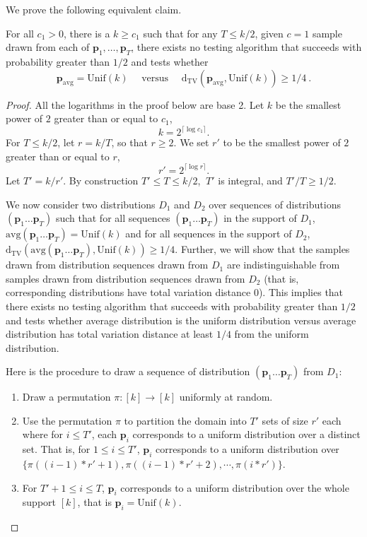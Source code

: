 \documentclass[10pt]{article} %
\theoremstyle{plain}
\newcommand{\bp}{\textbf{p}}
\newcommand{\unik}{\mathrm{Unif}(k)}%
\newcommand{\dtv}{\mathrm{d_{TV}}}
\newcommand{\avg}{\mathrm{avg}}
\begin{document}
We prove the following equivalent claim.
\begin{claim}
	For all $c_1 > 0$, there is a $k \geq c_1$ such that for any $T \leq k/2$, given $c=1$ sample drawn from each of $\bp_1,\dots,\bp_T$, there exists no testing algorithm that succeeds with probability greater than $1/2$ and tests whether 
	$$\bp_{\avg} =\unik \quad \text{ versus } \quad \dtv(\bp_{\avg},\unik) \geq 1/4~.$$
\end{claim}
\begin{proof}
	All the logarithms in the proof below are base 2.
	Let $k$ be the smallest power of $2$ greater than or equal to $c_1$,
	\[
	k = 2^{\lceil \log c_1 \rceil}.
	\]
	For $T \le k/2$, let $r = k/T$, so that $r \geq 2$. We set $r'$ to be the smallest power of $2$ greater than or equal to $r$,
	\[
	r' = 2^{\lceil \log r \rceil}.
	\]
	Let $T' = k/r'$. By construction $T' \leq T \leq k/2$, $\ T'$ is integral, and $T'/T \geq 1/2$.
	
	We now consider two distributions $D_1$ and $D_2$ over sequences of distributions $(\bp_1\dots \bp_T)$ such that for all sequences $(\bp_1\dots \bp_T)$ in the support of $D_1$, $\avg(\bp_1\dots \bp_T) = \unik$ and for all sequences in the support of $D_2$, $\dtv(\avg(\bp_1\dots \bp_T),\unik) \geq 1/4$. Further, we will show that the samples drawn from distribution sequences drawn from $D_1$ are indistinguishable from samples drawn from distribution sequences drawn from $D_2$ (that is, corresponding distributions have total variation distance $0$). This implies that there exists no testing algorithm that succeeds with probability greater than $1/2$ and tests whether  average distribution is the uniform distribution versus average distribution has total variation distance at least $1/4$ from the uniform distribution.
	
	Here is the procedure to draw a sequence of distribution $(\bp_1\dots \bp_T)$ from $D_1$:
	\begin{enumerate}
		\item Draw a permutation $\pi:[k] \rightarrow [k]$ uniformly at random.
		\item Use the permutation $\pi$ to partition the domain into $T'$ sets of size $r'$ each where  for $i \leq T'$, each $\bp_i$ corresponds to a uniform distribution over a distinct set. That is, for $1 \leq i \leq T'$, $\bp_i$ corresponds to a uniform distribution over $\{\pi\left((i-1)*r'+1\right), \pi\left((i-1)*r'+2\right), \cdots, \pi(i*r') \}$.
		\item For $T'+1 \leq i \leq T$, $\bp_i$ corresponds to a uniform distribution over the whole support $[k]$, that is $\bp_i = \unik$.
	\end{enumerate}
	

\end{proof}
\end{document}
